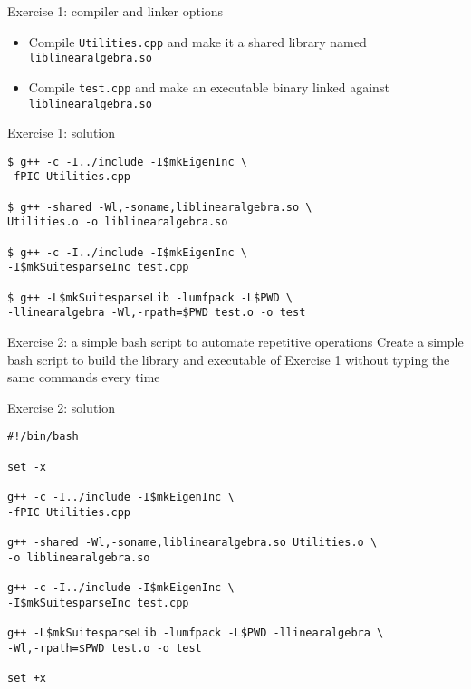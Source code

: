 \documentclass[10pt]{beamer}
\begin{document}
\begin{frame}{Exercise 1: compiler and linker options}
\begin{itemize}
\item Compile {\tt Utilities.cpp} and make it a shared library named {\tt liblinearalgebra.so}\\[5mm]
\item Compile {\tt test.cpp} and make an executable binary linked against {\tt liblinearalgebra.so}
\end{itemize}
\end{frame}

\begin{frame}[fragile]{Exercise 1: solution}
\begin{verbatim}
$ g++ -c -I../include -I$mkEigenInc \
-fPIC Utilities.cpp

$ g++ -shared -Wl,-soname,liblinearalgebra.so \
Utilities.o -o liblinearalgebra.so

$ g++ -c -I../include -I$mkEigenInc \
-I$mkSuitesparseInc test.cpp

$ g++ -L$mkSuitesparseLib -lumfpack -L$PWD \
-llinearalgebra -Wl,-rpath=$PWD test.o -o test

\end{verbatim}


\end{frame}



\begin{frame}{Exercise 2: a simple bash script to automate repetitive operations}
Create a simple bash script to build the library and executable of Exercise 1 without typing the same commands every time
\end{frame}

\begin{frame}[fragile]{Exercise 2: solution}
\begin{verbatim}
#!/bin/bash

set -x

g++ -c -I../include -I$mkEigenInc \
-fPIC Utilities.cpp

g++ -shared -Wl,-soname,liblinearalgebra.so Utilities.o \
-o liblinearalgebra.so

g++ -c -I../include -I$mkEigenInc \
-I$mkSuitesparseInc test.cpp

g++ -L$mkSuitesparseLib -lumfpack -L$PWD -llinearalgebra \
-Wl,-rpath=$PWD test.o -o test

set +x
\end{verbatim}
\end{frame}
\end{document}
